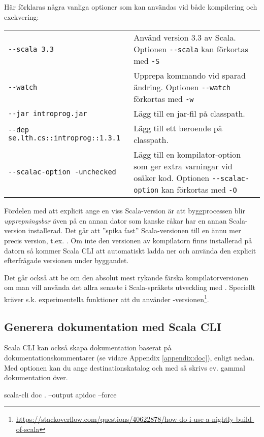 \noindent Här förklaras några vanliga optioner som kan användas vid både kompilering och exekvering: 
\begin{table}[H]
\begin{tabular}{l p{6.5cm}}
\texttt{-{}-scala 3.3} & Använd version 3.3 av Scala. Optionen \texttt{-{}-scala} kan förkortas med \texttt{-S} \\
\texttt{-{}-watch} & Upprepa kommando vid sparad ändring. Optionen \texttt{-{}-watch} förkortas med \texttt{-w} \\
\texttt{-{}-jar introprog.jar} & Lägg till en jar-fil på classpath. \\
\texttt{-{}-dep se.lth.cs::introprog::1.3.1} & Lägg till ett beroende på classpath. \\
\texttt{-{}-scalac-option -unchecked} & Lägg till en kompilator-option som ger extra varningar vid osäker kod.  Optionen \texttt{-{}-scalac-option} kan förkortas med \texttt{-O}\\
\end{tabular}
\end{table}

\noindent Fördelen med att explicit ange en viss Scala-version är att byggprocessen blir \emph{upprepningsbar} även på en annan dator som kanske råkar har en annan Scala-version installerad. Det går att ''spika fast'' Scala-versionen till en ännu mer precis version, t.ex. . Om inte den versionen av kompilatorn finns installerad på datorn så kommer Scala CLI att automatiskt ladda ner och använda den explicit efterfrågade versionen under byggandet.

Det går också att be om den absolut mest rykande färska kompilatorversionen om man vill använda det allra senaste i Scala-språkets utveckling med . Speciellt kräver s.k. experimentella funktioner att du använder -versionen\footnote{\url{https://stackoverflow.com/questions/40622878/how-do-i-use-a-nightly-build-of-scala}}. 

\subsection{Generera dokumentation med Scala CLI}

Scala CLI kan också skapa dokumentation baserat på dokumentationskommentarer (se vidare Appendix \ref{appendix:doc}), enligt nedan. Med optionen  kan du ange destinationskatalog och med  så skrivs ev. gammal dokumentation över.
\begin{REPLsmall}
scala-cli doc . --output apidoc --force
\end{REPLsmall}

